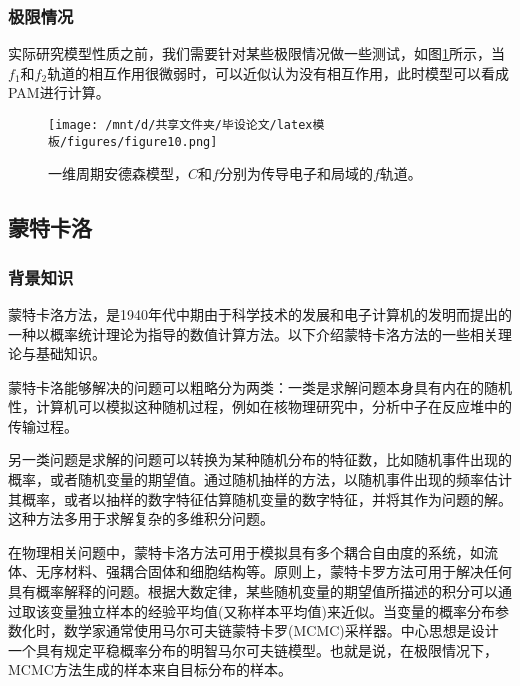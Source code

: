 \subsubsection{极限情况}
实际研究模型性质之前，我们需要针对某些极限情况做一些测试，如图\ref{fig4.1.3}所示，当$f_1$和$f_2$轨道的相互作用很微弱时，可以近似认为没有相互作用，此时模型可以看成PAM进行计算。
\begin{figure}[h]
    \centering
    \texttt{[image: /mnt/d/共享文件夹/毕设论文/latex模板/figures/figure10.png]}
    \caption{一维周期安德森模型，$C$和$f$分别为传导电子和局域的$f$轨道。}
    \label{fig4.1.3}
\end{figure}

\subsection{蒙特卡洛}%
\subsubsection{背景知识}
蒙特卡洛方法，是1940年代中期由于科学技术的发展和电子计算机的发明而提出的一种以概率统计理论为指导的数值计算方法。以下介绍蒙特卡洛方法的一些相关理论与基础知识。

蒙特卡洛能够解决的问题可以粗略分为两类：一类是求解问题本身具有内在的随机性，计算机可以模拟这种随机过程，例如在核物理研究中，分析中子在反应堆中的传输过程。

另一类问题是求解的问题可以转换为某种随机分布的特征数，比如随机事件出现的概率，或者随机变量的期望值。通过随机抽样的方法，以随机事件出现的频率估计其概率，或者以抽样的数字特征估算随机变量的数字特征，并将其作为问题的解。这种方法多用于求解复杂的多维积分问题。

在物理相关问题中，蒙特卡洛方法可用于模拟具有多个耦合自由度的系统，如流体、无序材料、强耦合固体和细胞结构等。原则上，蒙特卡罗方法可用于解决任何具有概率解释的问题。根据大数定律，某些随机变量的期望值所描述的积分可以通过取该变量独立样本的经验平均值(又称样本平均值)来近似。当变量的概率分布参数化时，数学家通常使用马尔可夫链蒙特卡罗(MCMC)采样器。中心思想是设计一个具有规定平稳概率分布的明智马尔可夫链模型。也就是说，在极限情况下，MCMC方法生成的样本来自目标分布的样本。

